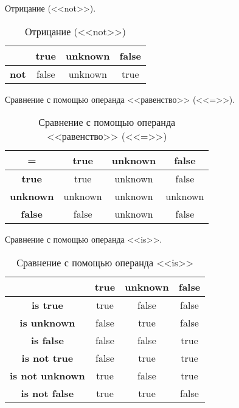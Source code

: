 \newpage


Отрицание (<<not>>).
\begin{table}[!h]
	\begin{center}
		\captionsetup{justification=raggedleft,singlelinecheck=off}
		\caption{Отрицание (<<not>>)} 
		\begin{tabular}[c]{|c|c|c|c|}
			\hline
			& \textbf{true} & \textbf{unknown} & \textbf{false}\\
			\hline
			\textbf{not} & false & unknown & true\\
			\hline
		\end{tabular}
	\end{center}
\end{table}

Сравнение с помощью операнда <<равенство>> (<<=>>).
\begin{table}[!h]
	\begin{center}
		\captionsetup{justification=raggedleft,singlelinecheck=off}
		\caption{Сравнение с помощью операнда <<равенство>> (<<=>>)} 
		\begin{tabular}[c]{|c|c|c|c|}
			\hline
			= & \textbf{true} & \textbf{unknown} & \textbf{false}\\
			\hline
			\textbf{true} & true & unknown & false\\
			\hline
			\textbf{unknown} & unknown & unknown & unknown \\
			\hline
			\textbf{false} & false & unknown & false \\
			\hline
		\end{tabular}
	\end{center}
\end{table}

Сравнение с помощью операнда <<is>>.
\begin{table}[!h]
	\begin{center}
		\captionsetup{justification=raggedleft,singlelinecheck=off}
		\caption{Сравнение с помощью операнда <<is>>} 
		\begin{tabular}[c]{|c|c|c|c|}
			\hline
			& true\textbf{} & \textbf{unknown} & \textbf{false}\\
			\hline
			\textbf{is true} & true & false & false\\
			\hline
			\textbf{is unknown} & false & true & false \\
			\hline
			\textbf{is false} & false & false & true \\
			\hline
			\textbf{is not true} & false & true & true \\
			\hline
			\textbf{is not unknown} & true & false & true \\
			\hline
			\textbf{is not false} & true & true & false \\
			\hline
		\end{tabular}
	\end{center}
\end{table}

